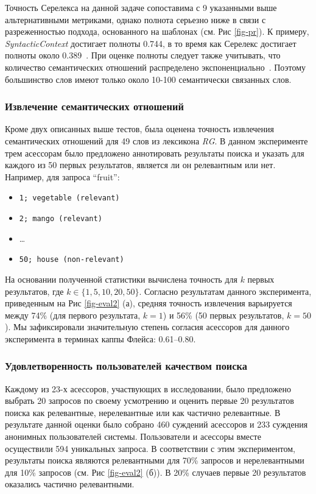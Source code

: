 \documentclass[a4paper,10pt,twoside]{article}
\begin{document}
Точность Серелекса на данной задаче сопоставима с 9 указанными выше альтернативными метриками, однако полнота серьезно ниже в связи с разреженностью подхода, основанного на шаблонах (см. Рис \ref{fig-pr}). К примеру, \textit{SyntacticContext} достигает полноты 0.744, в то время как Серелекс достигает полноты около 0.389~\cite{panchenko2012konvens}. При оценке полноты следует также учитывать, что количество семантических отношений распределено экспоненциально~\cite{panchenko2013phd}. Поэтому большинство слов имеют только около 10-100 семантически связанных слов. 

\subsubsection{Извлечение семантических отношений} 

Кроме двух описанных выше тестов, была оценена точность извлечения семантических отношений для 49 слов из лексикона \textit{RG}. В данном эксперименте трем асессорам было предложено аннотировать результаты поиска и указать для каждого из 50 первых результатов, является ли он релевантным или нет. Например, для запроса ``fruit'':

\begin{itemize}
  \footnotesize
  \item \texttt{1; vegetable (relevant)}
  \item \texttt{2; mango (relevant)}
  \item \ldots
  \item \texttt{50; house (non-relevant)}
\end{itemize} 

На основании полученной статистики вычислена точность для $k$ первых результатов, где $k \in \{1, 5, 10, 20, 50\}$. Согласно результатам данного эксперимента, приведенным на Рис \ref{fig-eval2} (а), средняя точность извлечения варьируется между 74\% (для первого результата, $k=1$) и 56\% (50 первых результатов, $k=50$). Мы зафиксировали значительную степень согласия асессоров для данного эксперимента в терминах каппы Флейса: 0.61--0.80.


\subsubsection{Удовлетворенность пользователей качеством поиска} 
Каждому из 23-х асессоров, участвующих в исследовании, было предложено выбрать 20 запросов по своему усмотрению и оценить первые 20 результатов поиска как релевантные, нерелевантные или как частично релевантные. В результате данной оценки было собрано 460 суждений асессоров и 233 суждения анонимных пользователей системы. Пользователи и асессоры вместе осуществили 594 уникальных запроса. В соответствии с этим экспериментом, результаты поиска являются релевантными для 70\% запросов и нерелевантными для 10\% запросов (см. Рис \ref{fig-eval2} (б)). В 20\% случаев первые 20 результатов оказались частично релевантными.
\end{document}

